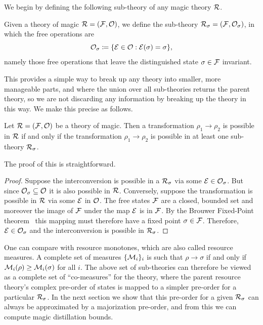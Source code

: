 \documentclass[pra,
aps,
twocolumn,
superscriptaddress,
groupedaddress,
nofootinbib,
reprint
]{revtex4-1}
\begin{document}
 We begin by defining the following sub-theory of any magic theory ${\mathcal R}$.
\begin{definition}\label{def:sigmafrag}
   Given a theory of magic ${\mathcal R} = ({\mathcal F}, {\mathcal O})$, we define the sub-theory ${\mathcal R}_\sigma = ({\mathcal F}, {\mathcal O}_\sigma)$, in which the free operations are 
   \begin{equation}
        {\mathcal O}_\sigma \coloneqq \{ {\mathcal E} \in {\mathcal O}: {\mathcal E}(\sigma) = \sigma \},
    \end{equation}
namely those free operations that leave the distinguished state $\sigma \in {\mathcal F}$ invariant.
\end{definition}
This provides a simple way to break up any theory into smaller, more manageable parts, and where the union over all sub-theories returns the parent theory, so we are not discarding any information by breaking up the theory in this way. We make this precise as follows.
\begin{theorem}\label{thm:frag}
    Let ${\mathcal R} = ({\mathcal F}, {\mathcal O})$ be a theory of magic.
Then a transformation $\rho_1 \rightarrow \rho_2$ is possible in ${\mathcal R}$ if and only if the transformation $\rho_1 \rightarrow \rho_2$ is possible in at least one sub-theory ${\mathcal R}_\sigma$.
\end{theorem}
The proof of this is straightforward.
\begin{proof}
   Suppose the interconversion is possible in a ${\mathcal R}_\sigma$ via some ${\mathcal E} \in {\mathcal O}_\sigma$. But since ${\mathcal O}_\sigma \subseteq {\mathcal O}$ it is also possible in ${\mathcal R}$. Conversely, suppose the transformation is possible in ${\mathcal R}$ via some ${\mathcal E}$ in ${\mathcal O}$. The free states ${\mathcal F}$ are a closed, bounded set and moreover the image of ${\mathcal F}$ under the map ${\mathcal E}$ is in ${\mathcal F}$. By the Brouwer Fixed-Point theorem~\cite{cit:brouwer} this mapping must therefore have a fixed point $\sigma \in {\mathcal F}$. Therefore, ${\mathcal E} \in {\mathcal O}_\sigma$ and the interconversion is possible in ${\mathcal R}_\sigma$.
\end{proof}
One can compare with resource monotones, which are also called resource measures. A complete set of measures $\{{\mathcal M}_i\}_i$ is such that $\rho \rightarrow \sigma$ if and only if ${\mathcal M}_i(\rho) \ge {\mathcal M}_i(\sigma)$ for all $i$. The above set of sub-theories can therefore be viewed as a complete set of ``co-measures'' for the theory, where the parent resource theory's complex pre-order of states is mapped to a simpler pre-order for a particular ${\mathcal R}_\sigma$. In the next section we show that this pre-order for a given ${\mathcal R}_\sigma$ can always be approximated by a majorization pre-order, and from this we can compute magic distillation bounds.
\end{document}
